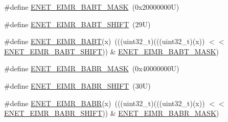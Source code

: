 \begin{DoxyCompactItemize}
\item 
\#define \mbox{\hyperlink{group___e_n_e_t___register___masks_gae9646ae2a082e18adeb6a1c2e654a821}{E\+N\+E\+T\+\_\+\+E\+I\+M\+R\+\_\+\+B\+A\+B\+T\+\_\+\+M\+A\+SK}}~(0x20000000\+U)
\item 
\#define \mbox{\hyperlink{group___e_n_e_t___register___masks_gad0fc34be1abc0e6059feb0ac0f7e7db1}{E\+N\+E\+T\+\_\+\+E\+I\+M\+R\+\_\+\+B\+A\+B\+T\+\_\+\+S\+H\+I\+FT}}~(29\+U)
\item 
\#define \mbox{\hyperlink{group___e_n_e_t___register___masks_ga326e179da4237c0006dd06250133e2cd}{E\+N\+E\+T\+\_\+\+E\+I\+M\+R\+\_\+\+B\+A\+BT}}(x)~(((uint32\+\_\+t)(((uint32\+\_\+t)(x)) $<$$<$ \mbox{\hyperlink{group___e_n_e_t___register___masks_gad0fc34be1abc0e6059feb0ac0f7e7db1}{E\+N\+E\+T\+\_\+\+E\+I\+M\+R\+\_\+\+B\+A\+B\+T\+\_\+\+S\+H\+I\+FT}})) \& \mbox{\hyperlink{group___e_n_e_t___register___masks_gae9646ae2a082e18adeb6a1c2e654a821}{E\+N\+E\+T\+\_\+\+E\+I\+M\+R\+\_\+\+B\+A\+B\+T\+\_\+\+M\+A\+SK}})
\item 
\#define \mbox{\hyperlink{group___e_n_e_t___register___masks_ga58e5d69da07a75b36ef7d5fe01b5275d}{E\+N\+E\+T\+\_\+\+E\+I\+M\+R\+\_\+\+B\+A\+B\+R\+\_\+\+M\+A\+SK}}~(0x40000000\+U)
\item 
\#define \mbox{\hyperlink{group___e_n_e_t___register___masks_ga21dfb3f07aa8f8591b954d3a3e91cd81}{E\+N\+E\+T\+\_\+\+E\+I\+M\+R\+\_\+\+B\+A\+B\+R\+\_\+\+S\+H\+I\+FT}}~(30\+U)
\item 
\#define \mbox{\hyperlink{group___e_n_e_t___register___masks_gaff81463efb6625d856af7e6792ecb83c}{E\+N\+E\+T\+\_\+\+E\+I\+M\+R\+\_\+\+B\+A\+BR}}(x)~(((uint32\+\_\+t)(((uint32\+\_\+t)(x)) $<$$<$ \mbox{\hyperlink{group___e_n_e_t___register___masks_ga21dfb3f07aa8f8591b954d3a3e91cd81}{E\+N\+E\+T\+\_\+\+E\+I\+M\+R\+\_\+\+B\+A\+B\+R\+\_\+\+S\+H\+I\+FT}})) \& \mbox{\hyperlink{group___e_n_e_t___register___masks_ga58e5d69da07a75b36ef7d5fe01b5275d}{E\+N\+E\+T\+\_\+\+E\+I\+M\+R\+\_\+\+B\+A\+B\+R\+\_\+\+M\+A\+SK}})
\end{DoxyCompactItemize}
